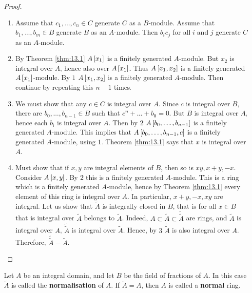 \begin{proof}
\hfill
\begin{enumerate}
\item Assume that $ c_1, \dots, c_n \in C $ generate $ C $ as a $ B $-module. Assume that $ b_1, \dots, b_m \in B $ generate $ B $ as an $ A $-module. Then $ b_ic_j $ for all $ i $ and $ j $ generate $ C $ as an $ A $-module.
\item By Theorem \ref{thm:13.1} $ A\sbr{x_1} $ is a finitely generated $ A $-module. But $ x_2 $ is integral over $ A $, hence also over $ A\sbr{x_1} $. Thus $ A\sbr{x_1, x_2} $ is a finitely generated $ A\sbr{x_1} $-module. By $ 1 $ $ A\sbr{x_1, x_2} $ is a finitely generated $ A $-module. Then continue by repeating this $ n - 1 $ times.
\item We must show that any $ c \in C $ is integral over $ A $. Since $ c $ is integral over $ B $, there are $ b_0, \dots, b_{n - 1} \in B $ such that $ c^n + \dots + b_0 = 0 $. But $ B $ is integral over $ A $, hence each $ b_i $ is integral over $ A $. Then by $ 2 $ $ A\sbr{b_0, \dots, b_{n - 1}} $ is a finitely generated $ A $-module. This implies that $ A\sbr{b_0, \dots, b_{n - 1}, c} $ is a finitely generated $ A $-module, using $ 1 $. Theorem \ref{thm:13.1} says that $ x $ is integral over $ A $.
\item Must show that if $ x, y $ are integral elements of $ B $, then so is $ xy, x + y, -x $. Consider $ A\sbr{x, y} $. By $ 2 $ this is a finitely generated $ A $-module. This is a ring which is a finitely generated $ A $-module, hence by Theorem \ref{thm:13.1} every element of this ring is integral over $ A $. In particular, $ x + y, -x, xy $ are integral. Let us show that $ \widetilde{A} $ is integrally closed in $ B $, that is for all $ x \in B $ that is integral over $ \widetilde{A} $ belongs to $ \widetilde{A} $. Indeed, $ A \subset \widetilde{A} \subset \widetilde{\widetilde{A}} $ are rings, and $ \widetilde{A} $ is integral over $ A $, $ \widetilde{\widetilde{A}} $ is integral over $ \widetilde{A} $. Hence, by $ 3 $ $ \widetilde{\widetilde{A}} $ is also integral over $ A $. Therefore, $ \widetilde{\widetilde{A}} = \widetilde{A} $.
\end{enumerate}
\end{proof}


\begin{definition}
Let $ A $ be an integral domain, and let $ B $ be the field of fractions of $ A $. In this case $ \widetilde{A} $ is called the \textbf{normalisation} of $ A $. If $ \widetilde{A} = A $, then $ A $ is called a \textbf{normal} ring.
\end{definition}

